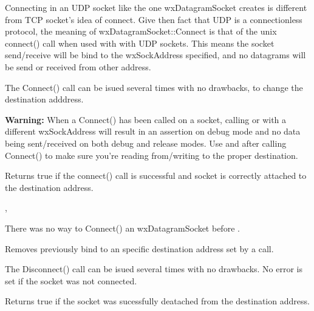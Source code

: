 Connecting in an UDP socket like the one wxDatagramSocket creates is different 
from TCP socket's idea of connect. Give then fact that UDP is a connectionless 
protocol, the meaning of wxDatagramSocket::Connect is that of the unix connect() 
call when used with with UDP sockets. This means the socket send/receive will be bind 
to the wxSockAddress specified, and no datagrams will be send or received from other 
address.

The Connect() call can be isued several times with no drawbacks, to change the destination 
adddress.

{\bf Warning:} When a Connect() has been called on a socket, calling  or  with a different wxSockAddress will result in an assertion on debug mode and 
no data being sent/received on both debug and release modes. Use  
 and 
after calling Connect() to make sure you're reading from/writing to the proper destination.




Returns true if the connect() call is successful and socket is correctly
attached to the destination address.


, 

 { There was no way to Connect() an wxDatagramSocket before }.

%
%
\label{wxdatagramsocketdisconnect}


Removes previously bind to an specific destination address set by a 
 call.

The Disconnect() call can be isued several times with no drawbacks. No error is set
if the socket was not connected.





Returns true if the socket was sucessfully deatached from the destination address.


